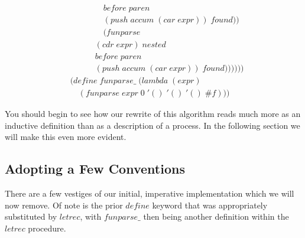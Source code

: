 \begin{figure}[htp]
\begin{align*}
\\& \qquad \qquad before \; paren \; 
\\& \qquad \qquad (push \; accum \; (car \; expr)) \; found))
\\& \qquad \qquad (funparse \; 
\\& \qquad \quad (cdr \; expr) \; nested \; 
\\& \qquad \quad before \; paren \; 
\\& \qquad \quad (push \; accum \; (car \; expr)) \; found))))))
\\& (define \; funparse\_ \; (lambda \; (expr)
\\& \quad (funparse \; expr \; 0 \; '() \; '() \; '() \; \#f))) \; 
\end{align*}
\end{figure}

You should begin to see how our rewrite of this algorithm reads much more as an inductive 
definition than as a description of a process. In the following section we will make this 
even more evident.

\subsection{Adopting a Few Conventions}
There are a few vestiges of our initial, imperative implementation which we will now remove. 
Of note is the prior $define$ keyword that was appropriately substituted by $letrec$, with 
$funparse\_$ then being another definition within the $letrec$ procedure.


